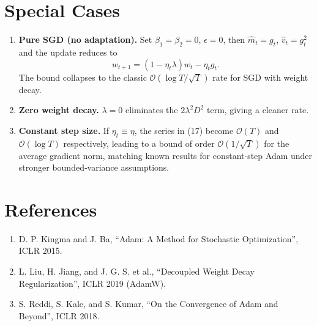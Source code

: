 \documentclass{article}
\begin{document}
\section*{Special Cases}
\begin{enumerate}[label=\arabic*)]
\item \textbf{Pure SGD (no adaptation).} Set $\beta_1=\beta_2=0$, $\epsilon=0$, then $\hat m_t=g_t$, $\hat v_t=g_t^2$ and the update reduces to
\[
w_{t+1}= (1-\eta_t\lambda) w_t - \eta_t g_t .
\]
The bound collapses to the classic $\mathcal{O}(\log T/\sqrt{T})$ rate for SGD with weight decay.

\item \textbf{Zero weight decay.} $\lambda=0$ eliminates the $2\lambda^2 D^2$ term, giving a cleaner rate.

\item \textbf{Constant step size.} If $\eta_t\equiv\eta$, the series in (17) become $\mathcal{O}(T)$ and $\mathcal{O}(\log T)$ respectively, leading to a bound of order $\mathcal{O}(1/\sqrt{T})$ for the average gradient norm, matching known results for constant‑step Adam under stronger bounded‑variance assumptions.

\end{enumerate}

\section*{References}
\begin{enumerate}
\item D. P. Kingma and J. Ba, “Adam: A Method for Stochastic Optimization”, ICLR 2015.
\item L. Liu, H. Jiang, and J. G. S. et al., “Decoupled Weight Decay Regularization”, ICLR 2019 (AdamW).
\item S. Reddi, S. Kale, and S. Kumar, “On the Convergence of Adam and Beyond”, ICLR 2018.
\end{enumerate}
\end{document}
